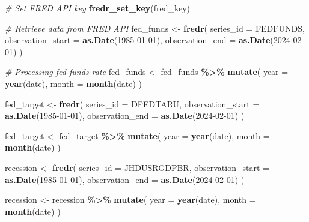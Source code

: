 \documentclass[
]{article}
\newenvironment{Shaded}{\begin{snugshade}}{\end{snugshade}}
\newcommand{\AttributeTok}[1]{\textcolor[rgb]{0.13,0.29,0.53}{#1}}
\newcommand{\CommentTok}[1]{\textcolor[rgb]{0.56,0.35,0.01}{\textit{#1}}}
\newcommand{\FunctionTok}[1]{\textcolor[rgb]{0.13,0.29,0.53}{\textbf{#1}}}
\newcommand{\NormalTok}[1]{#1}
\newcommand{\OtherTok}[1]{\textcolor[rgb]{0.56,0.35,0.01}{#1}}
\newcommand{\SpecialCharTok}[1]{\textcolor[rgb]{0.81,0.36,0.00}{\textbf{#1}}}
\newcommand{\StringTok}[1]{\textcolor[rgb]{0.31,0.60,0.02}{#1}}
\begin{document}
\begin{Shaded}
\begin{Highlighting}[]
\CommentTok{\# Set FRED API key}
\FunctionTok{fredr\_set\_key}\NormalTok{(fred\_key)}


\CommentTok{\# Retrieve data from FRED API}
\NormalTok{fed\_funds }\OtherTok{\textless{}{-}} \FunctionTok{fredr}\NormalTok{(}
  \AttributeTok{series\_id =} \StringTok{\textquotesingle{}FEDFUNDS\textquotesingle{}}\NormalTok{,}
  \AttributeTok{observation\_start =} \FunctionTok{as.Date}\NormalTok{(}\StringTok{\textquotesingle{}1985{-}01{-}01\textquotesingle{}}\NormalTok{),}
  \AttributeTok{observation\_end =} \FunctionTok{as.Date}\NormalTok{(}\StringTok{\textquotesingle{}2024{-}02{-}01\textquotesingle{}}\NormalTok{)}
\NormalTok{)}

\CommentTok{\# Processing fed funds rate}
\NormalTok{fed\_funds }\OtherTok{\textless{}{-}}\NormalTok{ fed\_funds }\SpecialCharTok{\%\textgreater{}\%}
  \FunctionTok{mutate}\NormalTok{(}
    \AttributeTok{year =} \FunctionTok{year}\NormalTok{(date),}
    \AttributeTok{month =} \FunctionTok{month}\NormalTok{(date)}
\NormalTok{  )}

\NormalTok{fed\_target }\OtherTok{\textless{}{-}} \FunctionTok{fredr}\NormalTok{(}
  \AttributeTok{series\_id =} \StringTok{\textquotesingle{}DFEDTARU\textquotesingle{}}\NormalTok{,}
  \AttributeTok{observation\_start =} \FunctionTok{as.Date}\NormalTok{(}\StringTok{\textquotesingle{}1985{-}01{-}01\textquotesingle{}}\NormalTok{),}
  \AttributeTok{observation\_end =} \FunctionTok{as.Date}\NormalTok{(}\StringTok{\textquotesingle{}2024{-}02{-}01\textquotesingle{}}\NormalTok{)}
\NormalTok{)}

\NormalTok{fed\_target }\OtherTok{\textless{}{-}}\NormalTok{ fed\_target }\SpecialCharTok{\%\textgreater{}\%}
  \FunctionTok{mutate}\NormalTok{(}
    \AttributeTok{year =} \FunctionTok{year}\NormalTok{(date),}
    \AttributeTok{month =} \FunctionTok{month}\NormalTok{(date)}
\NormalTok{  )}

\NormalTok{recession }\OtherTok{\textless{}{-}} \FunctionTok{fredr}\NormalTok{(}
  \AttributeTok{series\_id =} \StringTok{\textquotesingle{}JHDUSRGDPBR\textquotesingle{}}\NormalTok{,}
  \AttributeTok{observation\_start =} \FunctionTok{as.Date}\NormalTok{(}\StringTok{\textquotesingle{}1985{-}01{-}01\textquotesingle{}}\NormalTok{),}
  \AttributeTok{observation\_end =} \FunctionTok{as.Date}\NormalTok{(}\StringTok{\textquotesingle{}2024{-}02{-}01\textquotesingle{}}\NormalTok{)}
\NormalTok{)}

\NormalTok{recession }\OtherTok{\textless{}{-}}\NormalTok{ recession }\SpecialCharTok{\%\textgreater{}\%}
  \FunctionTok{mutate}\NormalTok{(}
    \AttributeTok{year =} \FunctionTok{year}\NormalTok{(date),}
    \AttributeTok{month =} \FunctionTok{month}\NormalTok{(date)}
\NormalTok{  )}


\end{Highlighting}
\end{Shaded}
\end{document}
